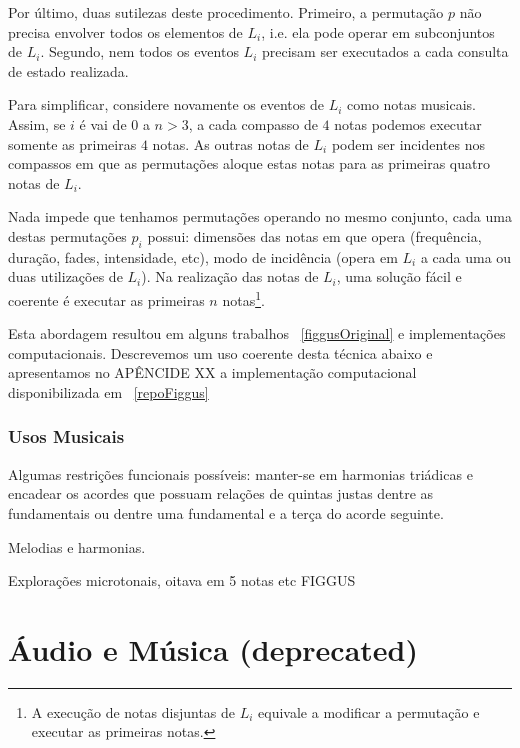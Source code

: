 Por último, duas sutilezas deste procedimento.
Primeiro, a permutação $p$ não precisa envolver todos os elementos de $L_i$, i.e. ela
pode operar em subconjuntos de $L_i$. Segundo, nem todos os eventos $L_i$ precisam ser executados a
cada consulta de estado realizada.

Para simplificar, considere novamente os eventos de $L_i$ 
como notas musicais. Assim, se $i$ é vai de $0$ a $n>3$, a cada compasso
de $4$ notas podemos executar somente as primeiras $4$ notas. As outras notas de
$L_i$ podem ser incidentes nos compassos em que as permutações aloque
estas notas para as primeiras quatro notas de $L_i$.

Nada impede que tenhamos permutações operando no mesmo conjunto, cada uma destas permutações
$p_i$
possui: dimensões das notas em que opera (frequência, duração, fades, intensidade, etc),
modo de incidência (opera em $L_i$ a cada uma ou duas utilizações de $L_i$). Na realização das notas de $L_i$, uma solução fácil e coerente é executar as primeiras $n$ notas\footnote{A execução de notas disjuntas de $L_i$ equivale a modificar a permutação e executar as primeiras notas.}.

Esta abordagem resultou em alguns trabalhos ~\ref{figgusOriginal} e implementações computacionais. Descrevemos um uso coerente desta técnica abaixo e apresentamos no APÊNCIDE XX a implementação computacional disponibilizada em ~\ref{repoFiggus}


\subsubsection{Usos Musicais}
Algumas restrições funcionais possíveis: manter-se em harmonias triádicas e encadear os acordes
que possuam relações de quintas justas dentre as fundamentais ou dentre uma fundamental
e a terça do acorde seguinte.

Melodias e harmonias.

Explorações microtonais, oitava em 5 notas etc
FIGGUS














\clearpage


\section{Áudio e Música (deprecated)}

